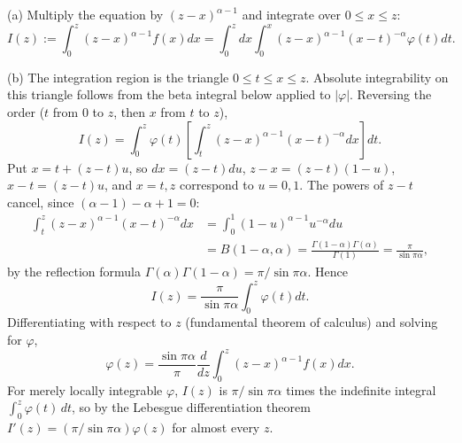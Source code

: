 (a) Multiply the equation by $(z-x)^{\alpha-1}$
and integrate over $0\le x\le z$:
\[
I(z):=\int_0^z(z-x)^{\alpha-1}f(x)dx
=\int_0^zdx\int_0^x
(z-x)^{\alpha-1}(x-t)^{-\alpha}\varphi(t)dt.
\]

(b) The integration region is the triangle $0\le t\le x\le z$.
Absolute integrability on this triangle follows from the beta integral
below applied to $|\varphi|$. Reversing the order ($t$ from $0$ to $z$,
then $x$ from $t$ to $z$),
\[
I(z)=\int_0^z\varphi(t)\left[
\int_t^z(z-x)^{\alpha-1}(x-t)^{-\alpha}dx\right]dt.
\]
Put $x=t+(z-t)u$, so $dx=(z-t)du$, $z-x=(z-t)(1-u)$, $x-t=(z-t)u$,
and $x=t,z$ correspond to $u=0,1$. The powers of $z-t$ cancel, since
$(\alpha-1)-\alpha+1=0$:
\[
\begin{aligned}
\int_t^z(z-x)^{\alpha-1}(x-t)^{-\alpha}dx
&=\int_0^1(1-u)^{\alpha-1}u^{-\alpha}du\\
&=B(1-\alpha,\alpha)
=\frac{\Gamma(1-\alpha)\Gamma(\alpha)}{\Gamma(1)}
=\frac{\pi}{\sin\pi\alpha},
\end{aligned}
\]
by the reflection formula $\Gamma(\alpha)\Gamma(1-\alpha)=\pi/\sin\pi\alpha$.
Hence
\[
I(z)=\frac{\pi}{\sin\pi\alpha}\int_0^z\varphi(t)dt.
\]
Differentiating with respect to $z$ (fundamental theorem of calculus)
and solving for $\varphi$,
\[
\boxed{\varphi(z)=\frac{\sin\pi\alpha}{\pi}
\frac{d}{dz}\int_0^z(z-x)^{\alpha-1}f(x)dx}.
\]
For merely locally integrable $\varphi$, $I(z)$ is $\pi/\sin\pi\alpha$
times the indefinite integral $\int_0^z\varphi(t)\,dt$, so by the
Lebesgue differentiation theorem $I'(z)=(\pi/\sin\pi\alpha)\varphi(z)$
for almost every $z$.

